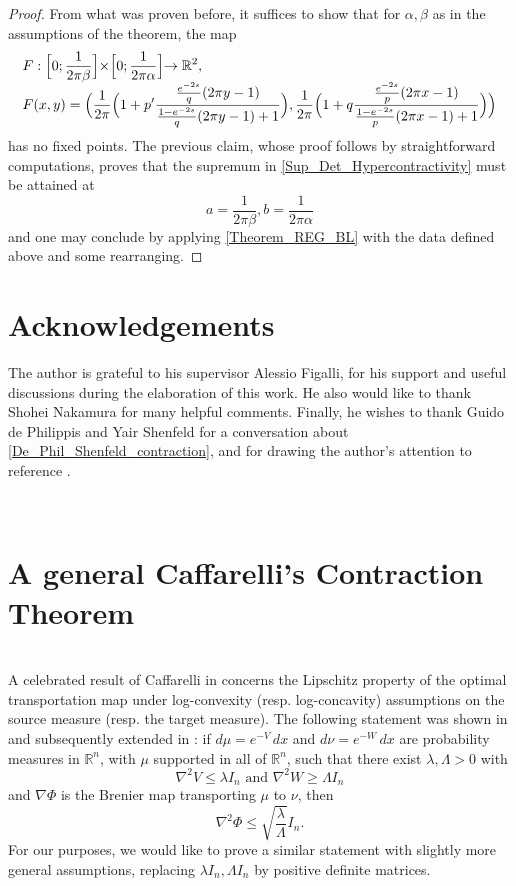 \documentclass[11pt,a4paper,reqno]{amsart}
\numberwithin{equation}{section}
\theoremstyle{definition}
\newcommand{\ds}{\displaystyle}
\newcommand{\<}{\ensuremath \leq}
\renewcommand{\>}{\ensuremath \geq}
\begin{document}
\begin{proof}
    From what was proven before, it suffices to show that for $\alpha, \beta$ as in the assumptions of the theorem, the map $$\begin{array}{lll}\ds F: \Bigl[0;\frac{1}{2\pi \beta}\Bigl] \times  \Bigl[ 0; \frac{1}{2\pi \alpha}\Bigl] \rightarrow \mathbb{R}^2, \\ \ds F(x,y)=\Bigl(\frac{1}{2\pi} \Bigl( 1+p'\frac{\frac{e^{-2s}}{q}(2\pi y-1)}{\frac{1-e^{-2s}}{q}(2\pi y-1)+1}\Bigl) ,\frac{1}{2\pi}\Bigl(1 +q\frac{\frac{e^{-2s}}{p}(2\pi x-1)}{\frac{1-e^{-2s}}{p}(2\pi x-1)+1}\Bigl)\Bigl) \end{array}$$ has no fixed points. The previous claim, whose proof follows by straightforward computations, proves that the supremum in \cref{Sup_Det_Hypercontractivity} must be attained at $$a=\frac{1}{2\pi \beta}, b=\frac{1}{2\pi \alpha}$$ and one may conclude by applying \cref{Theorem_REG_BL} with the data defined above and some rearranging. 
\end{proof}






\bigskip

\section*{Acknowledgements}

The author is grateful to his supervisor Alessio Figalli, for his support and useful discussions during the elaboration of this work. He also would like to thank Shohei Nakamura for many helpful comments. Finally, he wishes to thank Guido de Philippis and Yair Shenfeld for a conversation about \cref{De_Phil_Shenfeld_contraction}, and for drawing the author's attention to reference \cite{Gozlan}. 

\hfill \\



\appendix 

\section{A general Caffarelli's Contraction Theorem}

\hfill \\

A celebrated result of Caffarelli in \cite{Caff} concerns the Lipschitz property of the optimal transportation map under log-convexity (resp. log-concavity) assumptions on the source measure (resp. the target measure). The following statement was shown in \cite{Caff} and subsequently extended in \cite{Kolesnikov}:  if $d\mu=e^{-V}\, dx$ and $d\nu=e^{-W}\, dx$ are probability measures in $\mathbb{R}^n$, with $\mu$ supported in all of $\mathbb{R}^n$, such that there exist $\lambda,\Lambda>0$ with $$\nabla^2 V \leq \lambda I_n \text{ and } \nabla^2 W \geq \Lambda I_n$$ and $\nabla \Phi$ is the Brenier map transporting $\mu$ to $\nu$, then $$\nabla^2\Phi \leq \sqrt{\frac{\lambda}{\Lambda}}I_n.$$
For our purposes, we would like to prove a similar statement with slightly more general assumptions, replacing $\lambda I_n, \Lambda I_n$ by positive definite matrices. 
\end{document}
